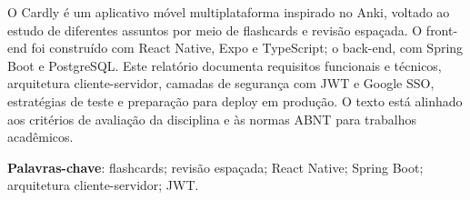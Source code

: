 \documentclass[
    12pt,
    a4paper,
    sumario=tradicional,
    chapter=TITLE
]{abntex2}
\begin{document}
\frenchspacing
\imprimircapa
\imprimirfolhaderosto

\begin{resumo}
O Cardly é um aplicativo móvel multiplataforma inspirado no Anki, voltado ao estudo de diferentes assuntos por meio de flashcards e revisão espaçada. O front-end foi construído com React Native, Expo e TypeScript; o back-end, com Spring Boot e PostgreSQL. Este relatório documenta requisitos funcionais e técnicos, arquitetura cliente-servidor, camadas de segurança com JWT e Google SSO, estratégias de teste e preparação para deploy em produção. O texto está alinhado aos critérios de avaliação da disciplina e às normas ABNT para trabalhos acadêmicos.

\textbf{Palavras-chave}: flashcards; revisão espaçada; React Native; Spring Boot; arquitetura cliente-servidor; JWT.
\end{resumo}

\tableofcontents
\cleardoublepage












\cleardoublepage

\end{document}
